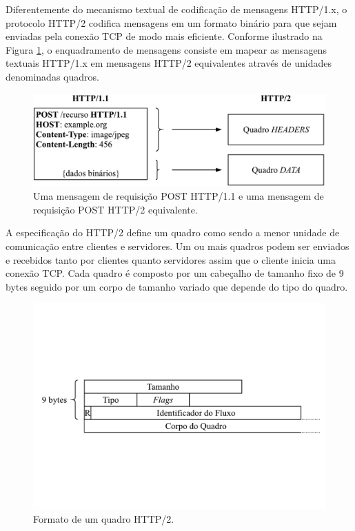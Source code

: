 Diferentemente do mecanismo textual de codificação de mensagens HTTP/1.x, o protocolo HTTP/2 codifica mensagens em um formato binário para que sejam enviadas pela conexão TCP de modo mais eficiente. Conforme ilustrado na Figura \ref{fig:framing}, o enquadramento de mensagens consiste em mapear as mensagens textuais HTTP/1.x em mensagens HTTP/2 equivalentes através de unidades denominadas quadros.

\begin{figure}[hbt!]
 \centering
  \includegraphics[width=\textwidth]{./fig/framing}
 \caption{Uma mensagem de requisição POST HTTP/1.1 e uma mensagem de requisição POST HTTP/2 equivalente.}
 \label{fig:framing}
\end{figure}

A especificação do HTTP/2 define um quadro como sendo a menor unidade de comunicação entre clientes e servidores. Um ou mais quadros podem ser enviados e recebidos tanto por clientes quanto servidores assim que o cliente inicia uma conexão TCP. Cada quadro é composto por um cabeçalho de tamanho fixo de 9 bytes seguido por um corpo de tamanho variado que depende do tipo do quadro.

\begin{figure}[hbt!]
 \centering
  \includegraphics[width=\textwidth]{./fig/quadro}
 \caption{Formato de um quadro HTTP/2.}
 \label{fig:quadro}
\end{figure}

